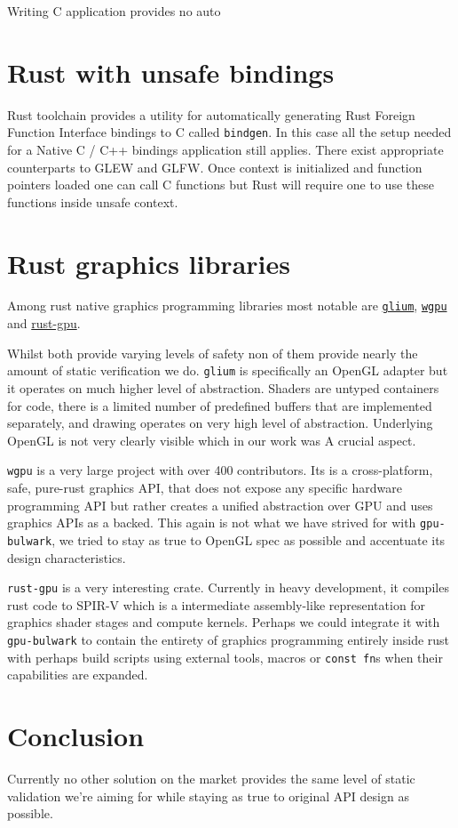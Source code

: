 Writing C application provides no auto

\section{Rust with unsafe bindings}

Rust toolchain provides a utility for automatically generating Rust Foreign Function Interface bindings to C called \texttt{bindgen}.
In this case all the setup needed for a Native C / C++ bindings application still applies. There exist appropriate counterparts to GLEW and GLFW.
Once context is initialized and function pointers loaded one can call C functions but Rust will require one to use these functions inside unsafe context.

\section{Rust graphics libraries}

Among rust native graphics programming libraries most notable are 
\href{https://github.com/glium/glium}{\texttt{glium}}, 
\href{https://github.com/gfx-rs/wgpu}{\texttt{wgpu}}
and \href{https://github.com/EmbarkStudios/rust-gpu}{rust-gpu}.

Whilst both provide varying levels of safety non of them provide nearly the amount of static verification we do.
\texttt{glium} is specifically an OpenGL adapter but it operates on much higher level of abstraction.
Shaders are untyped containers for code, there is a limited number of predefined buffers that are implemented separately, 
and drawing operates on very high level of abstraction. Underlying OpenGL is not very clearly visible which in our work was A
crucial aspect.

\texttt{wgpu} is a very large project with over 400 contributors. Its is a cross-platform, safe, pure-rust graphics API, that
does not expose any specific hardware programming API but rather creates a unified abstraction over GPU and uses graphics APIs 
as a backed.
This again is not what we have strived for with \texttt{gpu-bulwark}, we tried to stay as true to OpenGL spec as possible
and accentuate its design characteristics.

\texttt{rust-gpu} is a very interesting crate. Currently in heavy development, it compiles rust code to SPIR-V which is a intermediate 
assembly-like representation for graphics shader stages and compute kernels.
Perhaps we could integrate it with \texttt{gpu-bulwark} to contain the entirety of graphics programming entirely inside rust 
with perhaps build scripts using external tools, macros or \texttt{const fn}s when their capabilities are expanded.

\section{Conclusion}

Currently no other solution on the market provides the same level of static validation we're aiming for
while staying as true to original API design as possible.
